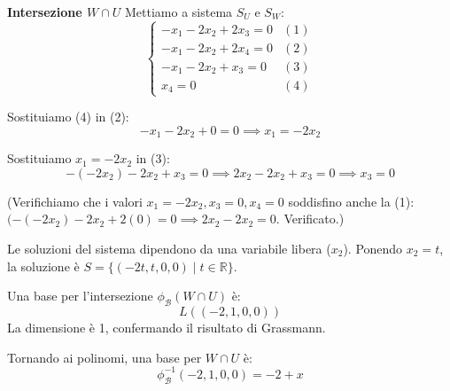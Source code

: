 {{        \textbf{Intersezione $W \cap U$}
        Mettiamo a sistema $S_U$ e $S_W$:
        \[ \begin{cases}
        -x_1 - 2x_2 + 2x_3 = 0 & (1) \\
        -x_1 - 2x_2 + 2x_4 = 0 & (2) \\
        -x_1 - 2x_2 + x_3 = 0 & (3) \\
        x_4 = 0 & (4)
        \end{cases} \]
        
        Sostituiamo (4) in (2):
        \[ -x_1 - 2x_2 + 0 = 0 \implies x_1 = -2x_2 \]
        
        Sostituiamo $x_1 = -2x_2$ in (3):
        \[ -(-2x_2) - 2x_2 + x_3 = 0 \implies 2x_2 - 2x_2 + x_3 = 0 \implies x_3 = 0 \]
        
        (Verifichiamo che i valori $x_1 = -2x_2, x_3=0, x_4=0$ soddisfino anche la (1): $(-(-2x_2) - 2x_2 + 2(0) = 0 \implies 2x_2 - 2x_2 = 0$. Verificato.)
        
        Le soluzioni del sistema dipendono da una variabile libera ($x_2$).
        Ponendo $x_2 = t$, la soluzione è $S = \{ (-2t, t, 0, 0) \mid t \in \mathbb{R} \}$.
        
        Una base per l'intersezione $\phi_{\mathcal{B}}(W \cap U)$ è:
        \[ L((-2, 1, 0, 0)) \]
        La dimensione è 1, confermando il risultato di Grassmann.
        
        Tornando ai polinomi, una base per $W \cap U$ è:
        \[ \phi_{\mathcal{B}}^{-1}(-2, 1, 0, 0) = -2 + x \]
    }
}


